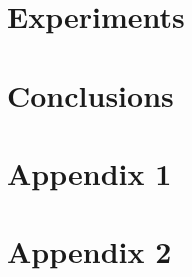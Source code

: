 \documentclass[twoside,openright,titlepage,numbers=noenddot,headinclude,footinclude=true,cleardoublepage=empty,listof=totoc,paper=a4,fontsize=11pt,australian,twoside=semi,DIV=calc]{scrreprt}
\begin{document}
  \chapter{Experiments}\label{c:Experiments}
  
  
  \chapter{Conclusions}\label{c:Conclusions}
  
  
  \cleardoublepage

  \appendix
 \chapter{Appendix 1}\label{app:A}
  \acresetall 
  
  \acresetall 
  \chapter{Appendix 2}\label{app:B}
  

  
  \singlespacing
  
  \cleardoublepage
  
  \pagestyle{empty}
  \onehalfspacing
  
\end{document}
